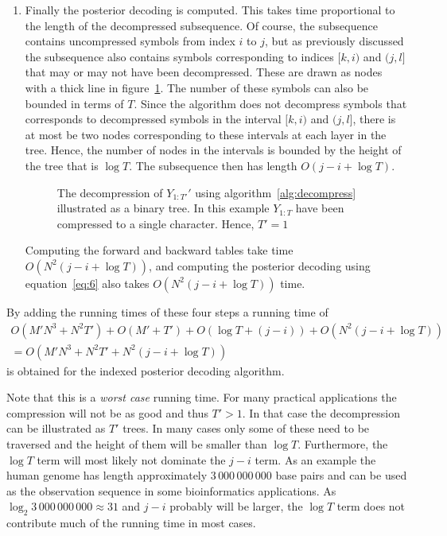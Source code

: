 \begin{enumerate}
\item Finally the posterior decoding is computed. This takes time proportional
  to the length of the decompressed subsequence. Of course, the subsequence
  contains uncompressed symbols from index $i$ to $j$, but as previously
  discussed the subsequence also contains  symbols corresponding to indices
  $[k, i)$ and $(j, l]$ that may or may not have been decompressed. These are
  drawn as nodes with a thick line in figure~\ref{fig:decompression}. The
  number of these symbols can also be bounded in terms of $T$. Since the
  algorithm does not decompress symbols that corresponds to decompressed
  symbols in the interval $[k, i)$ and $(j, l]$, there is at most be two nodes
  corresponding to these intervals at each layer in the tree. Hence, the number
  of nodes in the intervals is bounded by the height of the tree that is
  $\log T$. The subsequence then has length $O(j - i + \log T)$.

  \begin{figure}
    \centering
    
    \caption{The decompression of $Y_{1:T'}'$ using
      algorithm~\ref{alg:decompress} illustrated as a binary tree. In this
      example $Y_{1:T}$ have been compressed to a single character. Hence,
      $T' = 1$}
    \label{fig:decompression}
  \end{figure}

  Computing the forward and backward tables take time
  $O(N^2 (j - i + \log T))$, and computing the posterior decoding using
  equation~\eqref{eq:6} also takes $O(N^2 (j - i + \log T))$ time.
\end{enumerate}
By adding the running times of these four steps a running time of
\begin{gather*}
  O\left(M' N^3 + N^2 T'\right) + O\left(M' + T'\right) + O\left(\log T + (j - i)\right) + O\left(N^2 (j - i + \log T)\right) \\
  = O\left(M' N^3 + N^2 T' + N^2 (j - i + \log T)\right)
\end{gather*}
is obtained for the indexed posterior decoding algorithm.

Note that this is a \emph{worst case} running time. For many practical
applications the compression will not be as good and thus $T' > 1$. In that
case the decompression can be illustrated as $T'$ trees. In many cases only
some of these need to be traversed and the height of them will be
smaller than $\log T$. Furthermore, the $\log T$ term will most likely not
dominate the $j - i$ term. As an example the human genome has length
approximately $3\,000\,000\,000$ base pairs and can be used as the observation sequence
in some bioinformatics applications. As $\log_2 3\,000\,000\,000 \approx 31$ and
$j - i$ probably will be larger, the $\log T$ term does not contribute much
of the running time in most cases.

